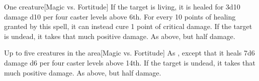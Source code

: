 \begin{spellheader}
    \spellrng{\rngclose}
\end{spellheader}
\begin{spelleffects}
    \begin{spelltarget}{One creature}[Magic vs. Fortitude]
        \spelleffect If the target is living, it is healed for 3d10 damage \add d10 per four caster levels above 6th. For every 10 points of healing granted by this spell, it can instead cure 1 point of critical damage.
        \spellsuccess If the target is undead, it takes that much positive damage.
        \spellfailure As above, but half damage.
    \end{spelltarget}
\end{spelleffects}

\begin{spellheader}
\end{spellheader}
\begin{spelleffects}
    \begin{spelltargets}{Up to five creatures in the area}[Magic vs. Fortitude]
        \spelleffect As , except that it heals 7d6 damage \add d6 per four caster levels above 14th.
        \spellsuccess If the target is undead, it takes that much positive damage.
        \spellfailure As above, but half damage.
    \end{spelltargets}
\end{spelleffects}

\begin{comment}
\subsubsection{D}
\end{comment}

